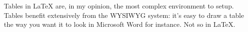 Tables in \LaTeX{} are, in my opinion, the most complex \gls{environment} to setup. Tables benefit extensively from the \gls{WYSIWYG} system: it's easy to draw a table the way you want it to look in Microsoft Word for instance. Not so in \LaTeX{}. 